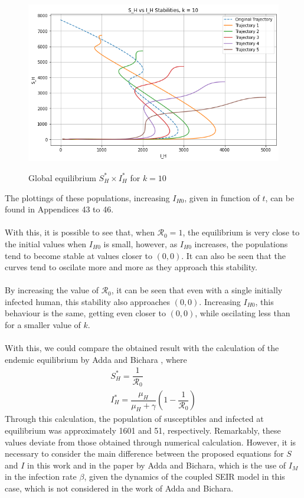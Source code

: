 \begin{figure}[!ht]
        \centering
        \hbox{\hspace{3.5em} \includegraphics[scale=0.55] {THESIS-SH_vs_IH_k=10.png}}
        \caption{Global equilibrium $S_H^* \times I_H^*$ for $k=10$}
\end{figure}
\newpage
The plottings of these populations, increasing $I_{H0}$, given in function of $t$, 
can be found in Appendices 43 to 46.
\\\\
With this, it is possible to see that, when $\mathcal{R}_0=1$, the equilibrium 
is very close to the initial values when $I_{H0}$ is small, however, as 
$I_{H0}$ increases, the populations tend to become stable at values closer 
to $(0,0)$. It can also be seen that the curves tend to oscilate more and more 
as they approach this stability.
\\\\
By increasing the value of $\mathcal{R}_0$, it can be seen that even with a 
single initially infected human, this stability also approaches $(0,0)$. 
Increasing $I_{H0}$, this behaviour is the same, getting even closer to $(0,0)$, 
while oscilating less than for a smaller value of $k$.
\\\\
With this, we could compare the obtained result with the calculation of 
the endemic equilibrium by Adda and Bichara \cite{adda2011global}, where
\begin{gather*}
        S_H^* = \dfrac{1}{\mathcal{R}_0} \\
        I_H^* = \dfrac{\mu_H}{\mu_H+\gamma}(1-\dfrac{1}{\mathcal{R}_0})
\end{gather*}       
Through this calculation, the population of susceptibles 
and infected at equilibrium was approximately 1601 and 51, 
respectively. Remarkably, these values deviate from those 
obtained through numerical calculation. However, it is 
necessary to consider the main difference between the proposed 
equations for $S$ and $I$ in this work and in the paper by Adda 
and Bichara, which is the use of $I_M$ in the infection rate $\beta$, 
given the dynamics of the coupled SEIR model in this case, which 
is not considered in the work of Adda and Bichara.